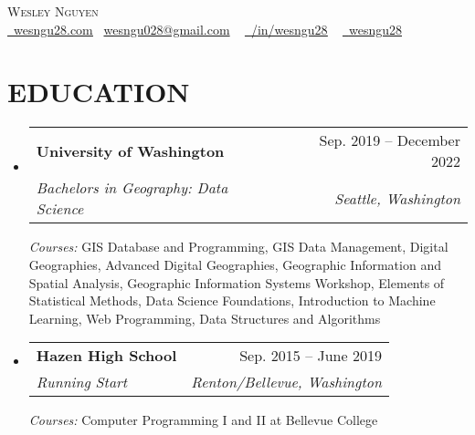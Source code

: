 \documentclass[letterpaper,11pt]{article}
\makeatletter
\newcommand{\resumeSubheading}[4]{
  \vspace{-2pt}\item
    \begin{tabular*}{0.97\textwidth}[t]{l@{\extracolsep{\fill}}r}
      \textbf{#1} & #2 \\
      \textit{\small#3} & \textit{\small #4} \\
    \end{tabular*}\vspace{-7pt}
}
\newcommand{\resumeSubHeadingListStart}{\begin{itemize}[leftmargin=0.15in, label={}]}
\newcommand{\resumeSubHeadingListEnd}{\end{itemize}}
\makeatother
\begin{document}

\begin{center}
    {\Huge \scshape Wesley Nguyen} \\ \vspace{1pt}\href{https://wesngu28.com}{\raisebox{-0.2\height}\faUser\ \underline{wesngu28.com}} {\raisebox{-0.2\height}\faEnvelope\  \underline{wesngu028@gmail.com}} ~
    \href{https://linkedin.com/in/wesngu28/}{\raisebox{-0.2\height}\faLinkedin\ \underline{/in/wesngu28}}  ~
    \href{https://github.com/wesngu28}{\raisebox{-0.2\height}\faGithub\ \underline{wesngu28}}
    \vspace{-8pt}
\end{center}


\section{EDUCATION}
  \resumeSubHeadingListStart
    \resumeSubheading
      {University of Washington}{Sep. 2019 -- December 2022}
      {Bachelors in Geography: Data Science}{Seattle, Washington}
      { \footnotesize{\newline{}\textit{{Courses:}} GIS Database and Programming, GIS Data Management, Digital Geographies, Advanced Digital Geographies, Geographic Information and Spatial Analysis, Geographic Information Systems Workshop, Elements of Statistical Methods, Data Science Foundations, Introduction to Machine Learning, Web Programming, Data Structures and Algorithms }}
    \resumeSubheading
      {Hazen High School}{Sep. 2015 -- June 2019}
      {Running Start}{Renton/Bellevue, Washington}
      { \footnotesize{\newline{}\textit{{Courses:}} Computer Programming I and II  at Bellevue College }}
  \resumeSubHeadingListEnd
\end{document}
